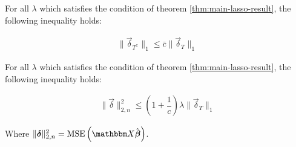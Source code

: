 \begin{claim}
\label{claim:lasso-claim-1}
For all $\lambda$ which satisfies the condition of theorem \ref{thm:main-lasso-result}, the following inequality holds:

\begin{align*}
\|\Vec{\delta}_{T^{\complement}}\|_1 \leq \bar{c} \|\Vec{\delta}_{T}\|_1
\end{align*}
\end{claim}

\begin{claim}
\label{claim:lasso-claim-2}
For all $\lambda$ which satisfies the condition of theorem \ref{thm:main-lasso-result}, the following inequality holds:

\begin{align*}
\|\Vec{\delta}\|_{2, n}^2 \leq \left(1 + \dfrac{1}{c}\right) \lambda \|\Vec{\delta}_T\|_1
\end{align*}

Where $\|\Vec{\delta}\|_{2, n}^2 = \mse{\Mat{X}\hat{\Vec{\beta}}}$.
\end{claim}


